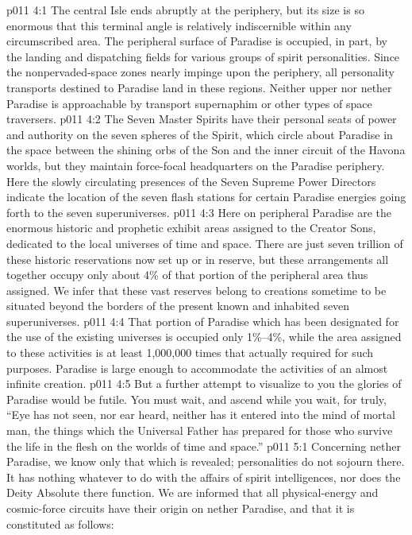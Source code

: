 \vs p011 4:1 The central Isle ends abruptly at the periphery, but its size is so enormous that this terminal angle is relatively indiscernible within any circumscribed area. The peripheral surface of Paradise is occupied, in part, by the landing and dispatching fields for various groups of spirit personalities. Since the nonpervaded\hyp{}space zones nearly impinge upon the periphery, all personality transports destined to Paradise land in these regions. Neither upper nor nether Paradise is approachable by transport supernaphim or other types of space traversers.
\vs p011 4:2 The Seven Master Spirits have their personal seats of power and authority on the seven spheres of the Spirit, which circle about Paradise in the space between the shining orbs of the Son and the inner circuit of the Havona worlds, but they maintain force\hyp{}focal headquarters on the Paradise periphery. Here the slowly circulating presences of the Seven Supreme Power Directors indicate the location of the seven flash stations for certain Paradise energies going forth to the seven superuniverses.
\vs p011 4:3 Here on peripheral Paradise are the enormous historic and prophetic exhibit areas assigned to the Creator Sons, dedicated to the local universes of time and space. There are just seven trillion of these historic reservations now set up or in reserve, but these arrangements all together occupy only about 4\% of that portion of the peripheral area thus assigned. We infer that these vast reserves belong to creations sometime to be situated beyond the borders of the present known and inhabited seven superuniverses.
\vs p011 4:4 That portion of Paradise which has been designated for the use of the existing universes is occupied only 1\%--4\%, while the area assigned to these activities is at least 1,000,000 times that actually required for such purposes. Paradise is large enough to accommodate the activities of an almost infinite creation.
\vs p011 4:5 But a further attempt to visualize to you the glories of Paradise would be futile. You must wait, and ascend while you wait, for truly, “Eye has not seen, nor ear heard, neither has it entered into the mind of mortal man, the things which the Universal Father has prepared for those who survive the life in the flesh on the worlds of time and space.”
\vs p011 5:1 Concerning nether Paradise, we know only that which is revealed; personalities do not sojourn there. It has nothing whatever to do with the affairs of spirit intelligences, nor does the Deity Absolute there function. We are informed that all physical\hyp{}energy and cosmic\hyp{}force circuits have their origin on nether Paradise, and that it is constituted as follows:
